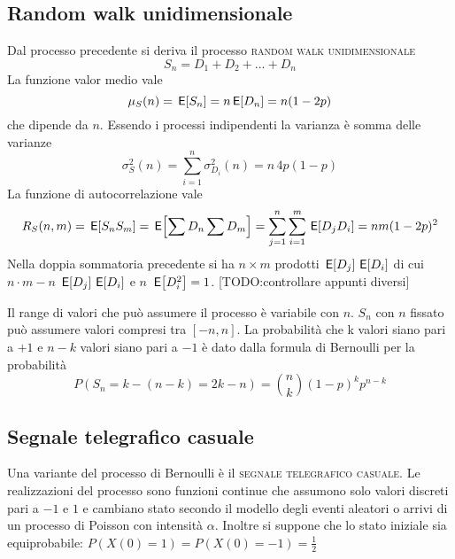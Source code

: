 \subsection{Random walk unidimensionale}
Dal processo precedente si deriva il processo \textsc{random walk unidimensionale}
\begin{equation}S_n=D_1+D_2+\dots+D_n\end{equation}
La funzione valor medio vale
\begin{equation}\mu_S(n)=\,{\operatorname{\mathsf{E}}}\!\left[{S_n}\right]=n\,{\operatorname{\mathsf{E}}}\!\left[{D_n}\right]=n(1-2p)\end{equation}
che dipende da $n$. Essendo i processi indipendenti la varianza è somma delle varianze
\begin{equation}\sigma^2_S(n)=\sum_{i=1}^{n}\sigma^2_{D_i}(n)=n\,4p(1-p)\end{equation}
La funzione di autocorrelazione vale
\begin{equation}R_S(n,m)=\,{\operatorname{\mathsf{E}}}\!\left[{S_n S_m}\right]=\,{\operatorname{\mathsf{E}}}\!\left[{\sum D_n \sum D_m}\right]=\sum_{j=1}^{n}\sum_{i=1}^{m}\,{\operatorname{\mathsf{E}}}\!\left[{D_j D_i}\right]=n m(1-2p)^2\end{equation}
Nella doppia sommatoria precedente si ha $n\times m$ prodotti $\,{\operatorname{\mathsf{E}}}\!\left[{D_j}\right]\,{\operatorname{\mathsf{E}}}\!\left[{D_i}\right]$ di cui $n\cdot m-n$ $\,{\operatorname{\mathsf{E}}}\!\left[{D_j}\right]\,{\operatorname{\mathsf{E}}}\!\left[{D_i}\right]$ e $n$ $\,{\operatorname{\mathsf{E}}}\!\left[{D^2_i}\right]=1$. [TODO:controllare appunti diversi]

Il range di valori che può assumere il processo è variabile con $n$. $S_n$ con $n$ fissato può assumere valori compresi tra $[-n,n]$. La probabilità che k valori siano pari a $+1$ e $n-k$ valori siano pari a $-1$ è dato dalla formula di Bernoulli per la probabilità
\[P(S_n=k-(n-k)=2k-n)=\binom{n}{k}(1-p)^k p^{n-k}\]

\subsection{Segnale telegrafico casuale}
Una variante del processo di Bernoulli è il \textsc{segnale telegrafico casuale}. Le realizzazioni del processo sono funzioni continue che assumono solo valori discreti pari a $-1$ e $1$ e cambiano stato secondo il modello degli eventi aleatori o arrivi di un processo di Poisson con intensità $\alpha$. Inoltre si suppone che lo stato iniziale sia equiprobabile: $P(X(0)=1)=P(X(0)=-1)=\frac{1}{2}$

\begin{figure}[h!]
\centering{}
\end{figure}


